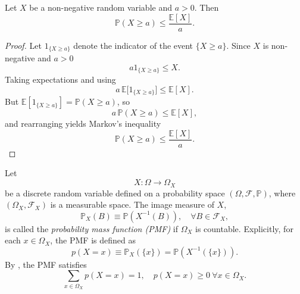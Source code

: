\begin{theorem}
Let $X$ be a non-negative random variable and $a > 0$. Then
\begin{equation}
\mathbb{P}(X \geq a) \leq \frac{\mathbb{E}[X]}{a}.
\end{equation}
\end{theorem}
\begin{proof}
	Let $1_{\{X\ge a\}}$ denote the indicator of the event $\{X\ge a\}$. Since $X$ is non-negative and $a>0$
	\begin{equation}
		a1_{\{X\ge a\}} \le X.
	\end{equation}
	Taking expectations and using 
	\begin{equation}
		a\,\mathbb{E}\big[1_{\{X\ge a\}}\big] \le \mathbb{E}[X].
	\end{equation}
	But $\mathbb{E}[1_{\{X\ge a\}}]=\mathbb{P}(X\ge a)$, so
	\begin{equation}
		a\,\mathbb{P}(X\ge a) \le \mathbb{E}[X],
	\end{equation}
	and rearranging yields Markov's inequality
	\begin{equation}
		\mathbb{P}(X\ge a) \le \frac{\mathbb{E}[X]}{a}.
	\end{equation}
\end{proof}


\begin{definition}
	\label{def:pmf}
	Let 
	\begin{equation}
		X: \Omega \to \Omega_X
	\end{equation}
	be a discrete random variable defined on a probability space $(\Omega, \mathcal{F}, \mathbb{P})$, where $(\Omega_X, \mathcal{F}_X)$ is a measurable space. The image measure of $X$,
	\begin{equation}
		\mathbb{P}_X(B) \equiv \mathbb{P}(X^{-1}(B)), \quad \forall B \in \mathcal{F}_X,
	\end{equation}
	is called the \emph{probability mass function (PMF)} if $\Omega_X$ is countable.  
	Explicitly, for each $x \in \Omega_X$, the PMF is defined as
	\begin{equation}
		p(X=x) \equiv \mathbb{P}_X(\{x\}) = \mathbb{P}(X^{-1}(\{x\})).
	\end{equation}
	By , the PMF satisfies
	\begin{equation}
		\sum_{x\in \Omega_X} p(X=x) = 1, \quad 
		p(X=x) \ge 0 \ \forall x \in \Omega_X.
	\end{equation}
\end{definition}

